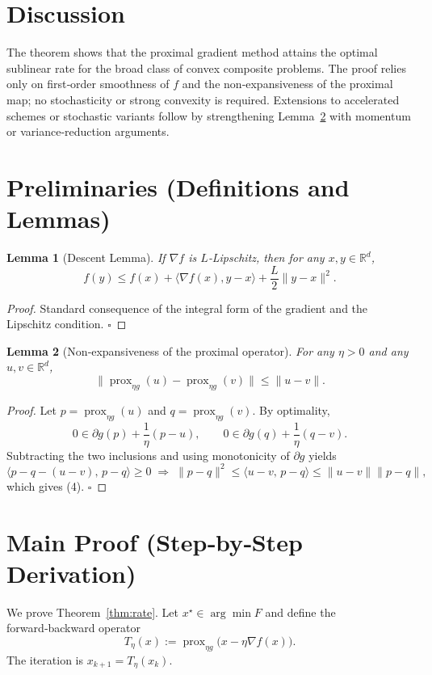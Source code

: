 \documentclass{article}
\newtheorem{lemma}{Lemma}
\newcommand{\prox}{\operatorname{prox}}
\newcommand{\R}{\mathbb{R}}
\begin{document}
\section*{Discussion}
The theorem shows that the proximal gradient method attains the optimal sublinear rate for the broad class of convex composite problems. The proof relies only on first‑order smoothness of $f$ and the non‑expansiveness of the proximal map; no stochasticity or strong convexity is required. Extensions to accelerated schemes or stochastic variants follow by strengthening Lemma~\ref{lem:nonexp} with momentum or variance‑reduction arguments.

\newpage
\section*{Preliminaries (Definitions and Lemmas)}
\begin{lemma}[Descent Lemma]\label{lem:descent}
If $\nabla f$ is $L$‑Lipschitz, then for any $x,y\in\R^{d}$,
\[
f(y)\le f(x)+\langle\nabla f(x),y-x\rangle+\frac{L}{2}\|y-x\|^{2}.
\tag{3}
\]
\end{lemma}
\begin{proof}
Standard consequence of the integral form of the gradient and the Lipschitz condition. \hfill $\square$
\end{proof}

\begin{lemma}[Non‑expansiveness of the proximal operator]\label{lem:nonexp}
For any $\eta>0$ and any $u,v\in\R^{d}$,
\[
\bigl\|\prox_{\eta g}(u)-\prox_{\eta g}(v)\bigr\|\le\|u-v\|.
\tag{4}
\]
\end{lemma}
\begin{proof}
Let $p=\prox_{\eta g}(u)$ and $q=\prox_{\eta g}(v)$. By optimality,
\[
0\in\partial g(p)+\frac{1}{\eta}(p-u),\qquad
0\in\partial g(q)+\frac{1}{\eta}(q-v).
\]
Subtracting the two inclusions and using monotonicity of $\partial g$ yields
\[
\langle p-q-\!(u-v),\,p-q\rangle\ge0
\;\Longrightarrow\;
\|p-q\|^{2}\le\langle u-v,\,p-q\rangle\le\|u-v\|\|p-q\|,
\]
which gives (4). \hfill $\square$
\end{proof}

\section*{Main Proof (Step‑by‑Step Derivation)}
We prove Theorem~\ref{thm:rate}.  
Let $x^{\star}\in\arg\min F$ and define the forward‑backward operator
\[
T_{\eta}(x):=\prox_{\eta g}\bigl(x-\eta\nabla f(x)\bigr).
\]
The iteration is $x_{k+1}=T_{\eta}(x_{k})$.
\end{document}
